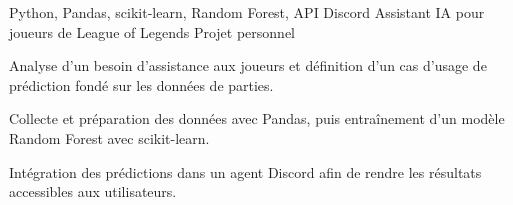 
\begin{cventries}
  \cventry
    {Python, Pandas, scikit-learn, Random Forest, API Discord}
    {Assistant IA pour joueurs de League of Legends}
    {Projet personnel}
    {}
    {
      \begin{cvitems}
        \item {Analyse d’un besoin d’assistance aux joueurs et définition d’un cas d’usage de prédiction fondé sur les données de parties.}
        \item {Collecte et préparation des données avec Pandas, puis entraînement d’un modèle Random Forest avec scikit-learn.}
        \item {Intégration des prédictions dans un agent Discord afin de rendre les résultats accessibles aux utilisateurs.}
      \end{cvitems}
    }
\end{cventries}
